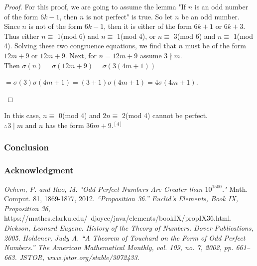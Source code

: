 \documentclass[12pt]{beamer}
\begin{document}
\begin{frame}
\begin{proof}
For this proof, we are going to assume the lemma "If $n$ is an odd number of the form $6k-1$, then $n$ is not perfect" is true.  So let $n$ be an odd number. Since $n$ is not of the form $6k-1$, then it is either of the form $6k+1$ or $6k+3$. Thus either $n \equiv$ 1(mod 6) and $n \equiv$ 1(mod 4), or $n \equiv$ 3(mod 6) and $n \equiv$ 1(mod 4). Solving these two congruence equations, we find that $n$ must be of the form $12m+9$ or $12m+9$. Next, for $n=12m+9$ assume $3 \nmid m$. \\
Then $\sigma (n) = \sigma (12m+9) = \sigma (3(4m+1))$ 
\begin{flushright}
$=\sigma (3) \sigma (4m+1) =(3+1) \sigma (4m+1) = 4\sigma(4m+1)$. 
\end{flushright}
\end{proof}	
\end{frame}
\begin{frame}
In this case, $n \equiv$ 0(mod 4) and $2n \equiv$ 2(mod 4) cannot be perfect. \\
$\therefore 3 \mid m$ and $n$ has the form $36m+9$.$^{[4]}$ 
\end{frame}




\begin{frame}
\frametitle{Conclusion}
\end{frame}

\begin{frame}
\frametitle{Acknowledgment}


\begin{thebibliography}{5}
\textit{Ochem, P. and Rao, M. "Odd Perfect Numbers Are Greater than $10^{1500}$."} Math. Comput. 81, 1869-1877, 2012.
\textit{“Proposition 36.” Euclid's Elements, Book IX, Proposition 36,} https://mathcs.clarku.edu/~djoyce/java/elements/bookIX/propIX36.html.
\textit{Dickson, Leonard Eugene. History of the Theory of Numbers. Dover Publications, 2005.}
\textit{Holdener, Judy A. “A Theorem of Touchard on the Form of Odd Perfect Numbers.” The American Mathematical Monthly, vol. 109, no. 7, 2002, pp. 661–663. JSTOR, www.jstor.org/stable/3072433.}
\end{thebibliography}

\end{frame}
\end{document}

